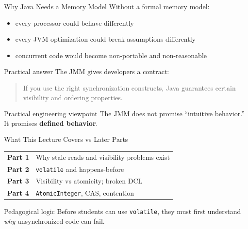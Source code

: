 \documentclass[aspectratio=169,11pt]{beamer}
\begin{document}
	\begin{frame}{Why Java Needs a Memory Model}
		Without a formal memory model:
		
		\begin{itemize}
			\item every processor could behave differently
			\item every JVM optimization could break assumptions differently
			\item concurrent code would become non-portable and non-reasonable
		\end{itemize}
		
		\vspace{0.3cm}
		
		\begin{alertblock}{Practical answer}
			The JMM gives developers a contract:
			\begin{quote}
				If you use the right synchronization constructs, Java guarantees certain visibility and ordering properties.
			\end{quote}
		\end{alertblock}
		
		\vspace{0.25cm}
		
		\begin{block}{Practical engineering viewpoint}
			The JMM does not promise “intuitive behavior.”  
			It promises \textbf{defined behavior}.
		\end{block}
	\end{frame}
	
	\begin{frame}{What This Lecture Covers vs Later Parts}
		\centering
		\begin{tabular}{>{\bfseries}m{3.2cm} m{7.6cm}}
			Part 1 & Why stale reads and visibility problems exist \\
			Part 2 & \texttt{volatile} and happens-before \\
			Part 3 & Visibility vs atomicity; broken DCL \\
			Part 4 & \texttt{AtomicInteger}, CAS, contention \\
		\end{tabular}
		
		\vspace{0.45cm}
		
		\begin{exampleblock}{Pedagogical logic}
			Before students can use \texttt{volatile}, they must first understand \emph{why} unsynchronized code can fail.
		\end{exampleblock}
	\end{frame}
	
\end{document}

